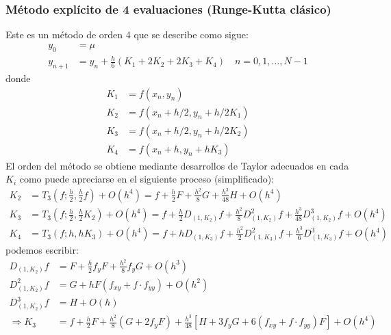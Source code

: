 
\subsubsection{Método explícito de 4 evaluaciones (Runge-Kutta clásico)}

Este es un método de orden 4 que se describe como sigue:
\begin{align*}
    y_0     & =\mu                                                                      \\
    y_{n+1} & =y_n+\frac{h}{6}\left(K_1+2 K_2+2 K_3+K_4\right) \quad n=0,1, \ldots, N-1
\end{align*}
donde
\begin{align*}
    K_1 & =f\left(x_n, y_n\right)                 \\
    K_2 & =f\left(x_n+h / 2, y_n+h / 2 K_1\right) \\
    K_3 & =f\left(x_n+h / 2, y_n+h / 2 K_2\right) \\
    K_4 & =f\left(x_n+h, y_n+h K_3\right)
\end{align*}
El orden del método se obtiene mediante desarrollos de Taylor adecuados en cada $K_i$ como puede apreciarse en el siguiente proceso (simplificado):
\begin{align*}
    K_2 & =T_3\left(f ; \frac{h}{2}, \frac{h}{2} f\right)+O\left(h^4\right)=f+\frac{h}{2} F+\frac{h^2}{8} G+\frac{h^3}{48} H+O\left(h^4\right)                                                                               \\
    K_3 & =T_3\left(f ; \frac{h}{2}, \frac{h}{2} K_2\right)+O\left(h^4\right)=f+\frac{h}{2} D_{\left(1, K_2\right)} f+\frac{h^2}{8} D_{\left(1, K_2\right)}^2 f+\frac{h^3}{48} D_{\left(1, K_2\right)}^3 f+O\left(h^4\right) \\
    K_4 & =T_3\left(f ; h, h K_3\right)+O\left(h^4\right)=f+h D_{\left(1, K_3\right)} f+\frac{h^2}{2} D_{\left(1, K_3\right)}^2 f+\frac{h^3}{6} D_{\left(1, K_3\right)}^3 f+O\left(h^4\right)
\end{align*}
podemos escribir:
\begin{align*}
    D_{\left(1, K_2\right)} f   & =F+\frac{h}{2} f_y F+\frac{h^2}{8} f_y G+O\left(h^3\right)                                                                                          \\
    D_{\left(1, K_2\right)}^2 f & =G+h F\left(f_{x y}+f \cdot f_{y y}\right)+O\left(h^2\right)                                                                                        \\
    D_{\left(1, K_2\right)}^3 f & =H+O(h)                                                                                                                                             \\
    \Rightarrow K_3             & =f+\frac{h}{2} F+\frac{h^2}{8}\left(G+2 f_y F\right)+\frac{h^3}{48}\left[H+3 f_y G+6\left(f_{x y}+f \cdot f_{y y}\right) F\right]+O\left(h^4\right)
\end{align*}
